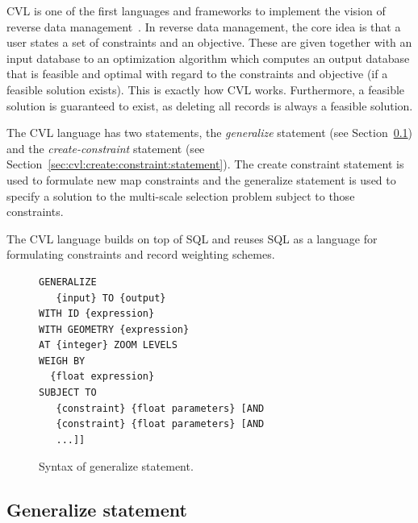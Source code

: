 \documentclass[11pt, oneside]{report}
\begin{document}
{CVL is one of the first languages and frameworks to implement the vision of reverse data management~\cite{meliou2011reverse}. In reverse data management, the core idea is that a user states a set of constraints and an objective. These are given together with an input database to an optimization algorithm which computes an output database that is feasible and optimal with regard to the constraints and objective (if a feasible solution exists). This is exactly how CVL works. Furthermore, a feasible solution is guaranteed to exist, as deleting all records is always a feasible solution.

The CVL language has two statements, the \emph{generalize} statement (see Section~\ref{sec:cvl:generalize:statement}) and the \emph{create-constraint} statement (see Section~\ref{sec:cvl:create:constraint:statement}). The create constraint statement is used to formulate new map constraints and the generalize statement is used to specify a solution to the multi-scale selection problem subject to those constraints.

The CVL language builds on top of SQL and reuses SQL as a language for formulating constraints and record weighting schemes.

\begin{figure}[!t]
\begin{center}
\begin{lstlisting}
GENERALIZE 
   {input} TO {output}
WITH ID {expression}
WITH GEOMETRY {expression}
AT {integer} ZOOM LEVELS
WEIGH BY
  {float expression}
SUBJECT TO 
   {constraint} {float parameters} [AND
   {constraint} {float parameters} [AND
   ...]]
\end{lstlisting}
\vspace*{-1ex}
\caption{Syntax of generalize statement.}
\label{fig:cvl:generalize:syntax}
\end{center}
\vspace*{-4ex}
\end{figure}

\subsection{Generalize statement}
\label{sec:cvl:generalize:statement}

}
\end{document}
